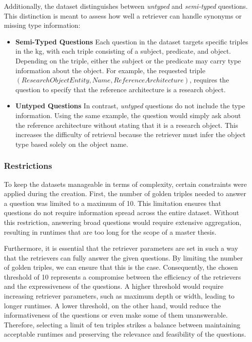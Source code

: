 Additionally, the dataset distinguishes between \emph{untyped} and \emph{semi-typed} questions. This distinction is meant to assess how well a retriever can handle synonyms or missing type information:

\begin{itemize}
    \item \textbf{Semi-Typed Questions} Each question in the dataset targets specific triples in the \gls{kg}, with each triple consisting of a subject, predicate, and object. Depending on the triple, either the subject or the predicate may carry type information about the object. For example, the requested triple $(Research Object Entity, Name, Reference Architecture)$, requires the question to specify that the reference architecture is a research object.
    
    \item \textbf{Untyped Questions} In contrast, \emph{untyped} questions do not include the type information. Using the same example, the question would simply ask about the reference architecture without stating that it is a research object. This increases the difficulty of retrieval because the retriever must infer the object type based solely on the object name.
\end{itemize}


\subsubsection{Restrictions} 

To keep the datasets manageable in terms of complexity, certain constraints were applied during the creation. First, the number of golden triples needed to answer a question was limited to a maximum of 10. This limitation ensures that questions do not require information spread across the entire dataset. Without this restriction, answering broad questions would require extensive aggregation, resulting in runtimes that are too long for the scope of a master thesis.

Furthermore, it is essential that the retriever parameters are set in such a way that the retrievers can fully answer the given questions. By limiting the number of golden triples, we can ensure that this is the case. Consequently, the chosen threshold of 10 represents a compromise between the efficiency of the retrievers and the expressiveness of the questions. A higher threshold would require increasing retriever parameters, such as maximum depth or width, leading to longer runtimes. A lower threshold, on the other hand, would reduce the informativeness of the questions or even make some of them unanswerable. Therefore, selecting a limit of ten triples strikes a balance between maintaining acceptable runtimes and preserving the relevance and feasibility of the questions.

